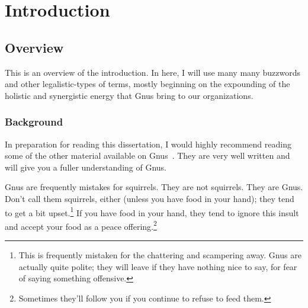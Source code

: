 %
%
%
%
%
%
%
%
%
%


%
%

\chapter{Introduction}

\section{Overview}

This is an overview of the introduction.  In here, I will use many
many buzzwords and other legalistic-types of terms, mostly beginning on
the expounding of the holistic and synergistic energy that Gnus bring
to our organizations.

\subsection{Background}

In preparation for reading this dissertation, I would highly recommend
reading some of the other material available on
Gnus~\citep{gnus98:_gerry_ganst,greenfield96:_gettin_know_gnu}.  They
are very well written and will give you a fuller understanding of
Gnus.

Gnus are frequently mistakes for squirrels.  They are not squirrels.
They are Gnus.  Don't call them squirrels, either (unless you have
food in your hand); they tend to get a bit upset.\footnote{This is
  frequently mistaken for the chattering and scampering away.  Gnus
  are actually quite polite; they will leave if they have nothing nice
  to say, for fear of saying something offensive.}  If you have food
in your hand, they tend to ignore this insult and accept your food as
a peace offering.\footnote{Sometimes they'll follow you if you continue
to refuse to feed them.}

